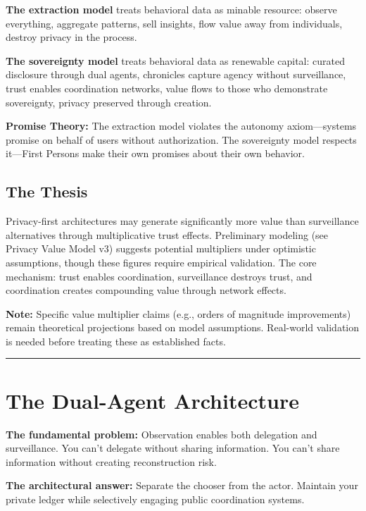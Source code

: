 \documentclass[
]{article}
\begin{document}
\textbf{The extraction model} treats behavioral data as minable
resource: observe everything, aggregate patterns, sell insights, flow
value away from individuals, destroy privacy in the process.

\textbf{The sovereignty model} treats behavioral data as renewable
capital: curated disclosure through dual agents, chronicles capture
agency without surveillance, trust enables coordination networks, value
flows to those who demonstrate sovereignty, privacy preserved through
creation.

\textbf{Promise Theory:} The extraction model violates the autonomy
axiom---systems promise on behalf of users without authorization. The
sovereignty model respects it---First Persons make their own promises
about their own behavior.

\subsection{The Thesis}\label{the-thesis}

Privacy-first architectures may generate significantly more value than
surveillance alternatives through multiplicative trust effects.
Preliminary modeling (see Privacy Value Model v3) suggests potential
multipliers under optimistic assumptions, though these figures require
empirical validation. The core mechanism: trust enables coordination,
surveillance destroys trust, and coordination creates compounding value
through network effects.

\textbf{Note:} Specific value multiplier claims (e.g., orders of
magnitude improvements) remain theoretical projections based on model
assumptions. Real-world validation is needed before treating these as
established facts.

\begin{center}\rule{0.5\linewidth}{0.5pt}\end{center}

\section{The Dual-Agent Architecture}\label{the-dual-agent-architecture}

\textbf{The fundamental problem:} Observation enables both delegation
and surveillance. You can't delegate without sharing information. You
can't share information without creating reconstruction risk.

\textbf{The architectural answer:} Separate the chooser from the actor.
Maintain your private ledger while selectively engaging public
coordination systems.
\end{document}
